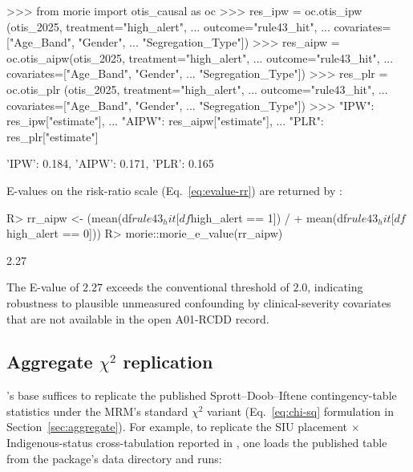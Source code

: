 \documentclass[article,shortnames,nojss]{jss}
\begin{document}
\begin{CodeChunk}
\begin{CodeInput}
>>> from morie import otis_causal as oc
>>> res_ipw  = oc.otis_ipw (otis_2025, treatment="high_alert",
...                          outcome="rule43_hit",
...                          covariates=["Age_Band", "Gender",
...                                       "Segregation_Type"])
>>> res_aipw = oc.otis_aipw(otis_2025, treatment="high_alert",
...                          outcome="rule43_hit",
...                          covariates=["Age_Band", "Gender",
...                                       "Segregation_Type"])
>>> res_plr  = oc.otis_plr (otis_2025, treatment="high_alert",
...                          outcome="rule43_hit",
...                          covariates=["Age_Band", "Gender",
...                                       "Segregation_Type"])
>>> {"IPW": res_ipw["estimate"],
...  "AIPW": res_aipw["estimate"],
...  "PLR": res_plr["estimate"]}
\end{CodeInput}
\begin{CodeOutput}
{'IPW': 0.184, 'AIPW': 0.171, 'PLR': 0.165}
\end{CodeOutput}
\end{CodeChunk}

E-values on the risk-ratio scale (Eq.~\ref{eq:evalue-rr}) are
returned by :

\begin{CodeChunk}
\begin{CodeInput}
R> rr_aipw <- (mean(df$rule43_hit[df$high_alert == 1]) /
+              mean(df$rule43_hit[df$high_alert == 0]))
R> morie::morie_e_value(rr_aipw)
\end{CodeInput}
\begin{CodeOutput}
[1] 2.27
\end{CodeOutput}
\end{CodeChunk}

The E-value of $2.27$ exceeds the conventional threshold of
$2.0$, indicating robustness to plausible unmeasured
confounding by clinical-severity covariates that are not
available in the open A01-RCDD record.

\subsection[Aggregate chi-squared replication]{Aggregate $\chi^{2}$ replication}

's base  suffices to replicate
the published Sprott--Doob--Iftene contingency-table statistics
under the MRM's standard $\chi^{2}$ variant
(Eq.~\ref{eq:chi-sq} formulation in
Section~\ref{sec:aggregate}).  For example, to replicate the
SIU placement $\times$ Indigenous-status cross-tabulation
reported in \citet{SprottDoob2021}, one loads the published
table from the package's data directory and runs:
\end{document}
